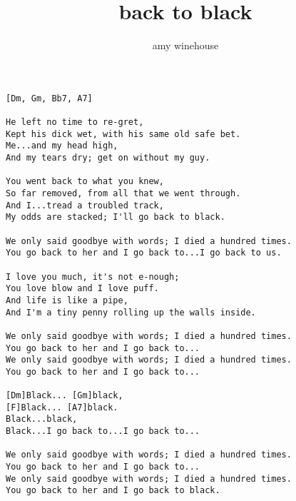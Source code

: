 \author{amy winehouse}
\title{back to black}
\maketitle
\begin{verbatim}
[Dm, Gm, Bb7, A7]

He left no time to re-gret,
Kept his dick wet, with his same old safe bet.
Me...and my head high,
And my tears dry; get on without my guy.

You went back to what you knew,
So far removed, from all that we went through.
And I...tread a troubled track,
My odds are stacked; I'll go back to black.

We only said goodbye with words; I died a hundred times.
You go back to her and I go back to...I go back to us.

I love you much, it's not e-nough;
You love blow and I love puff.
And life is like a pipe,
And I'm a tiny penny rolling up the walls inside.

We only said goodbye with words; I died a hundred times.
You go back to her and I go back to...
We only said goodbye with words; I died a hundred times.
You go back to her and I go back to...

[Dm]Black... [Gm]black,
[F]Black... [A7]black.
Black...black,
Black...I go back to...I go back to...

We only said goodbye with words; I died a hundred times.
You go back to her and I go back to...
We only said goodbye with words; I died a hundred times.
You go back to her and I go back to black.
\end{verbatim}